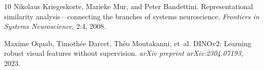 \documentclass[letterpaper]{article}
\begin{document}
\begin{thebibliography}{10}
Nikolaus Kriegeskorte, Marieke Mur, and Peter Bandettini.
\newblock Representational similarity analysis---connecting the branches of systems neuroscience.
\newblock \emph{Frontiers in Systems Neuroscience}, 2:4, 2008.

Maxime Oquab, Timoth{\'e}e Darcet, Th{\'e}o Moutakanni, et~al.
\newblock DINOv2: Learning robust visual features without supervision.
\newblock \emph{arXiv preprint arXiv:2304.07193}, 2023.

\end{thebibliography}
\end{document}
